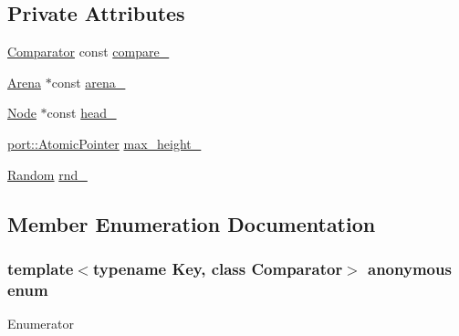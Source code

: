 \subsection*{Private Attributes}
\begin{DoxyCompactItemize}
\item 
\hyperlink{structleveldb_1_1_comparator}{Comparator} const \hyperlink{classleveldb_1_1_skip_list_ab59a01d670b82316fd0532c17cb45a37}{compare\-\_\-}
\item 
\hyperlink{classleveldb_1_1_arena}{Arena} $\ast$const \hyperlink{classleveldb_1_1_skip_list_ae5eb0912ac01174439bc009ab74e366c}{arena\-\_\-}
\item 
\hyperlink{structleveldb_1_1_skip_list_1_1_node}{Node} $\ast$const \hyperlink{classleveldb_1_1_skip_list_abe0e7aa843a469bf63d1d1c9b64582f0}{head\-\_\-}
\item 
\hyperlink{classleveldb_1_1port_1_1_atomic_pointer}{port\-::\-Atomic\-Pointer} \hyperlink{classleveldb_1_1_skip_list_a08b97b9da8e1fd93d2c6ae4915dc132f}{max\-\_\-height\-\_\-}
\item 
\hyperlink{classleveldb_1_1_random}{Random} \hyperlink{classleveldb_1_1_skip_list_ae418eb7ce6b8e0a4ea95b8b782e02c9e}{rnd\-\_\-}
\end{DoxyCompactItemize}


\subsection{Member Enumeration Documentation}
\hypertarget{classleveldb_1_1_skip_list_a2e64dde7e3a6df57e1b4a43ff4ab0ef8}{\subsubsection[{anonymous enum}]{\setlength{\rightskip}{0pt plus 5cm}template$<$typename Key, class Comparator$>$ anonymous enum\hspace{0.3cm}{\ttfamily [private]}}}\label{classleveldb_1_1_skip_list_a2e64dde7e3a6df57e1b4a43ff4ab0ef8}
\begin{Desc}
\item[Enumerator]\par
\begin{description}
\item[{\em 
\hypertarget{classleveldb_1_1_skip_list_a2e64dde7e3a6df57e1b4a43ff4ab0ef8a60ca280962bbbc6e8055b14fb11a81b5}{k\-Max\-Height}\label{classleveldb_1_1_skip_list_a2e64dde7e3a6df57e1b4a43ff4ab0ef8a60ca280962bbbc6e8055b14fb11a81b5}
}]\end{description}
\end{Desc}


